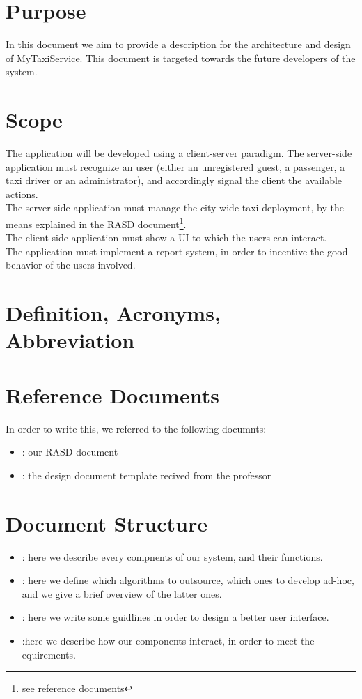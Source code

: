 \section{Purpose}
In this document we aim to provide a description for the architecture and design of MyTaxiService.
This document is targeted towards the future developers of the system.

\section{Scope}
The application will be developed using a client-server paradigm.
The server-side application must recognize an user (either an unregistered guest, a passenger, a taxi driver or an administrator), 
and accordingly signal the client the available actions. \\
The server-side application must manage the city-wide taxi deployment, by the means explained in the RASD 
document\footnote{see reference documents}. \\ The client-side application must show a UI to which the users can interact. \\
The application must implement a report system, in order to incentive the good behavior of the users involved.

\section{Definition, Acronyms, Abbreviation}


\section{Reference Documents}
In order to write this, we referred to the following documnts:
\begin{itemize}
 \item [1]: our RASD document
 \item [2]: the design document template recived from the professor
\end{itemize}

\section{Document Structure}
\begin{itemize} 
 \item[Architectural design]: here we describe every compnents of our system, and their functions.
 \item[Algorithm design]: here we define which algorithms to outsource, which ones to develop ad-hoc, 
 and we give a brief overview of the latter ones.
 \item[User interface design]: here we write some guidlines in order to design a better user interface.
 \item[Requirements traceability]:here we describe how our components interact, in order to meet the equirements.
\end{itemize}
